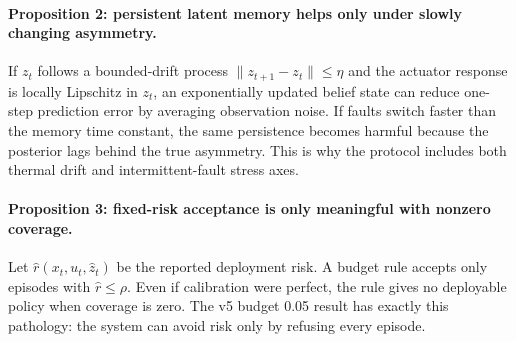 \documentclass{article}
\begin{document}
\paragraph{Proposition 2: persistent latent memory helps only under slowly changing asymmetry.}
If $z_t$ follows a bounded-drift process $\|z_{t+1}-z_t\|\leq\eta$ and the actuator response is locally Lipschitz in $z_t$, an exponentially updated belief state can reduce one-step prediction error by averaging observation noise. If faults switch faster than the memory time constant, the same persistence becomes harmful because the posterior lags behind the true asymmetry. This is why the protocol includes both thermal drift and intermittent-fault stress axes.
\paragraph{Proposition 3: fixed-risk acceptance is only meaningful with nonzero coverage.}
Let $\hat r(x_t,u_t,\hat z_t)$ be the reported deployment risk. A budget rule accepts only episodes with $\hat r\leq\rho$. Even if calibration were perfect, the rule gives no deployable policy when coverage is zero. The v5 budget 0.05 result has exactly this pathology: the system can avoid risk only by refusing every episode.
\end{document}
